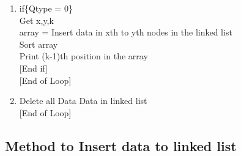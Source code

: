 \documentclass[a4paper,12pt]{article}
\begin{document}
\begin{enumerate}[Step 1:]
\item \hspace*{15mm} if\{Qtype = 0\}\\
\hspace*{21mm}         Get x,y,k\\
\hspace*{21mm}          array = {\color{blue}Insert} data in xth to yth nodes in the linked list\\
\hspace*{21mm}         {\color{blue}Sort} array\\
\hspace*{21mm}         Print (k-1)th position in the array\\
\hspace*{16mm}      [End if]\\
\hspace*{11mm}      [End of Loop]
\item \hspace*{10mm} {\color{blue}Delete all Data} Data in linked list\\
\hspace*{1mm}  [End of Loop]



\end{enumerate}

\newpage

\subsection*{Method to Insert data to linked list}
\end{document}
